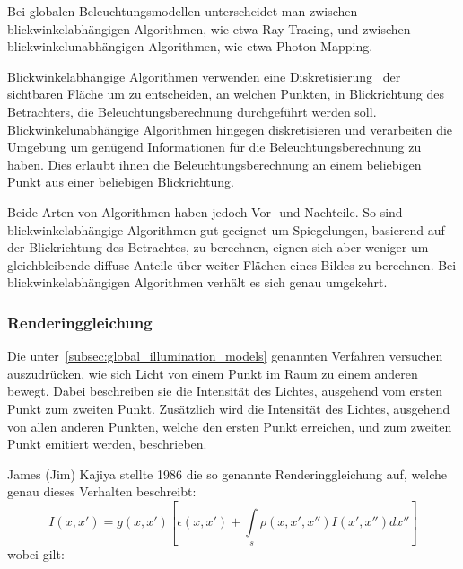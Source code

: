 Bei globalen Beleuchtungsmodellen unterscheidet man zwischen blickwinkelabhängigen Algorithmen, wie etwa Ray Tracing, und zwischen blickwinkelunabhängigen Algorithmen, wie etwa Photon Mapping.

Blickwinkelabhängige Algorithmen verwenden eine Diskretisierung~ der sichtbaren Fläche um zu entscheiden, an welchen Punkten, in Blickrichtung des Betrachters, die Beleuchtungsberechnung durchgeführt werden soll. Blickwinkelunabhängige Algorithmen hingegen diskretisieren und verarbeiten die Umgebung um genügend Informationen für die Beleuchtungsberechnung zu haben. Dies erlaubt ihnen die Beleuchtungsberechnung an einem beliebigen Punkt aus einer beliebigen Blickrichtung.

Beide Arten von Algorithmen haben jedoch Vor- und Nachteile. So sind blickwinkelabhängige Algorithmen gut geeignet um Spiegelungen, basierend auf der Blickrichtung des Betrachtes, zu berechnen, eignen sich aber weniger um gleichbleibende diffuse Anteile über weiter Flächen eines Bildes zu berechnen. Bei blickwinkelabhängigen Algorithmen verhält es sich genau umgekehrt.

\subsubsection{Renderinggleichung}
\label{ssubsec:rendering_equation}

Die unter~\ref{subsec:global_illumination_models} genannten Verfahren versuchen auszudrücken, wie sich Licht von einem Punkt im Raum zu einem anderen bewegt. Dabei beschreiben sie die Intensität des Lichtes, ausgehend vom ersten Punkt zum zweiten Punkt. Zusätzlich wird die Intensität des Lichtes, ausgehend von allen anderen Punkten, welche den ersten Punkt erreichen, und zum zweiten Punkt emitiert werden, beschrieben.

James (Jim) Kajiya stellte 1986 die so genannte Renderinggleichung auf, welche genau dieses Verhalten beschreibt:
\begin{equation}
    I(x, x') = g(x, x')[\epsilon(x, x') + \int\limits_{s}\rho(x, x', x'')I(x', x'')dx'']
\end{equation}
wobei gilt:

